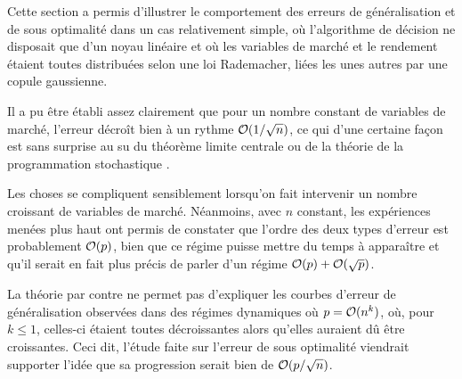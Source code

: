 Cette section a permis d'illustrer le comportement des erreurs de généralisation et de
sous optimalité dans un cas relativement simple, où l'algorithme de décision ne disposait
que d'un noyau linéaire et où les variables de marché et le rendement étaient toutes
distribuées selon une loi Rademacher, liées les unes autres par une copule gaussienne.

Il a pu être établi assez clairement que pour un nombre constant de variables de marché,
l'erreur décroît bien à un rythme $\mathcal O(1/\sqrt{n})$, ce qui d'une certaine façon est
sans surprise au su du théorème limite centrale ou de la théorie de la programmation
stochastique .

Les choses se compliquent sensiblement lorsqu'on fait intervenir un nombre croissant de
variables de marché. Néanmoins, avec $n$ constant, les expériences menées plus haut ont
permis de constater que l'ordre des deux types d'erreur est probablement $\mathcal O(p)$, bien
que ce régime puisse mettre du temps à apparaître et qu'il serait en fait plus précis de
parler d'un régime $\mathcal O(p) + \mathcal O(\sqrt{p})$.

La théorie par contre ne permet pas d'expliquer les courbes d'erreur de généralisation
observées dans des régimes dynamiques où $p=\mathcal O(n^k)$, où, pour $k\leq1$, celles-ci étaient
toutes décroissantes alors qu'elles auraient dû être croissantes. Ceci dit, l'étude faite
sur l'erreur de sous optimalité viendrait supporter l'idée que sa progression serait bien
de $\mathcal O(p/\sqrt{n})$. 


\clearpage

